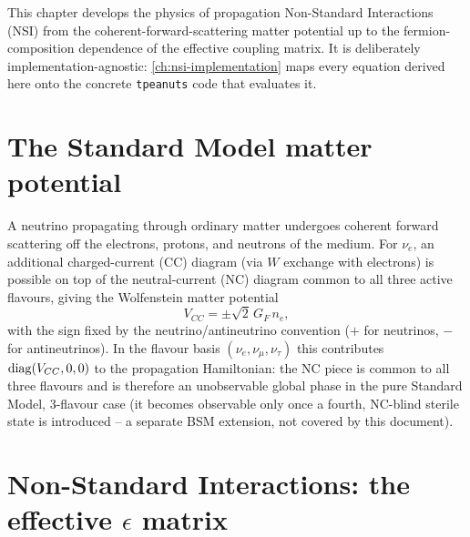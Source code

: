 \label{ch:nsi-theory}

This chapter develops the physics of propagation Non-Standard Interactions
(NSI) from the coherent-forward-scattering matter potential up to the
fermion-composition dependence of the effective coupling matrix. It is
deliberately implementation-agnostic: \cref{ch:nsi-implementation} maps every
equation derived here onto the concrete \texttt{tpeanuts} code that evaluates
it.

\section{The Standard Model matter potential}

\begin{theorybox}
A neutrino propagating through ordinary matter undergoes coherent forward
scattering off the electrons, protons, and neutrons of the medium. For
$\nu_e$, an additional charged-current (CC) diagram (via $W$ exchange with
electrons) is possible on top of the neutral-current (NC) diagram common to
all three active flavours, giving the Wolfenstein matter
potential~\parencite{Wolfenstein1978,MikheyevSmirnov1985}
\begin{equation}
  V_{CC} = \pm\sqrt{2}\,G_F\,n_e,
\end{equation}
with the sign fixed by the neutrino/antineutrino convention ($+$ for
neutrinos, $-$ for antineutrinos). In the flavour basis $(\nu_e,\nu_\mu,\nu_\tau)$
this contributes $\operatorname{diag}(V_{CC},0,0)$ to the propagation Hamiltonian: the NC
piece is common to all three flavours and is therefore an unobservable global
phase in the pure Standard Model, 3-flavour case (it becomes observable only
once a fourth, NC-blind sterile state is introduced -- a separate BSM
extension, not covered by this document).
\end{theorybox}

\section{Non-Standard Interactions: the effective $\epsilon$ matrix}


